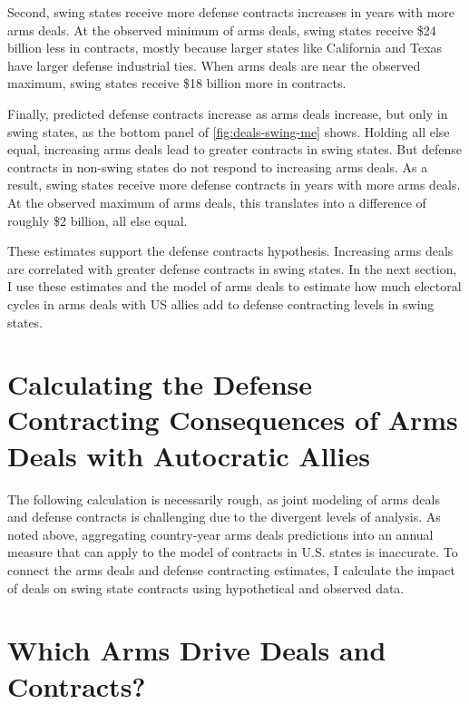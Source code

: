 \documentclass[12pt]{article}
\begin{document}
Second, swing states receive more defense contracts increases in years with more arms deals. 
At the observed minimum of arms deals, swing states receive \$24 billion less in contracts, mostly because larger states like California and Texas have larger defense industrial ties. 
When arms deals are near the observed maximum, swing states receive \$18 billion more in contracts. 


Finally, predicted defense contracts increase as arms deals increase, but only in swing states, as the bottom panel of \autoref{fig:deals-swing-me} shows. 
Holding all else equal, increasing arms deals lead to greater contracts in swing states. 
But defense contracts in non-swing states do not respond to increasing arms deals.
As a result, swing states receive more defense contracts in years with more arms deals. 
At the observed maximum of arms deals, this translates into a difference of roughly \$2 billion, all else equal. 


These estimates support the defense contracts hypothesis. 
Increasing arms deals are correlated with greater defense contracts in swing states. 
In the next section, I use these estimates and the model of arms deals to estimate how much electoral cycles in arms deals with US allies add to defense contracting levels in swing states.  


\section{Calculating the Defense Contracting Consequences of Arms Deals with Autocratic Allies}


The following calculation is necessarily rough, as joint modeling of arms deals and defense contracts is challenging due to the divergent levels of analysis. 
As noted above, aggregating country-year arms deals predictions into an annual measure that can apply to the model of contracts in U.S. states is inaccurate.%
To connect the arms deals and defense contracting estimates, I calculate the impact of deals on swing state contracts using hypothetical and observed data.
 


\section{Which Arms Drive Deals and Contracts?} 
\end{document}

